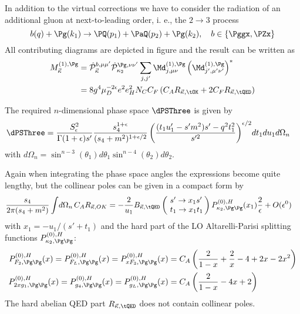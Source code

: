 \label{sec:NLO.g}
In addition to the virtual corrections we have to consider the radiation of an additional gluon at next-to-leading order, i. e., the $2\to 3$ process
\begin{equation}
b(q) + \Pg(k_1) \rightarrow \PQ(p_1)+\PaQ(p_2) + \Pg(k_2),\quad b\in\{\Pggx,\PZx\}
\end{equation}
All contributing diagrams are depicted in figure  and the result can be written as
\begin{align}
M_{\vec \kappa}^{(1),\Pg} &= \hat {\mathcal P}_{\vec \kappa}^{b,\mu\mu'}\hat {\mathcal P}_{\kappa_2}^{\Pg,\nu\nu'}\sum_{j,j'}\Md^{(1),\Pg}_{j,\mu\nu}\left(\Md^{(1),\Pg}_{j',\mu'\nu'}\right)^*\\
 &= 8g^4\mu_D^{-2\epsilon}e^2e_H^2 N_C C_F\left( C_A R_{\vec \kappa,\tOK} + 2C_F R_{\vec \kappa,\tQED}\right)
\end{align}

The required $n$-dimensional phase space $\dPSThree$ is given by
\begin{align}
\dPSThree &= \frac{S_\epsilon^2}{\Gamma(1+\epsilon)s'} \frac{s_4^{1+\epsilon}}{(s_4+m^2)^{1+\epsilon/2}}\left(\frac{(t_1u_1'-s'm^2)s' - q^2t_1^2}{s'^2}\right)^{\epsilon/2}\! dt_1 du_1 d\Omega_n
\end{align}
with $d\Omega_n = \sin^{n-3}(\theta_1)d\theta_1\sin^{n-4}(\theta_2)d\theta_2$.

Again when integrating the phase space angles the expressions become quite lengthy, but the collinear poles can be given in a compact form by
\begin{align}
\frac{s_4}{2\pi(s_4+m^2)}\int\!d\Omega_n \,C_A R_{\vec \kappa,OK} &=-\frac 2 {u_1}B_{\vec \kappa,\tQED}\left(\!\begin{array}{l}s'\rightarrow x_1s'\\t_1\rightarrow x_1 t_1\end{array}\!\!\right) P^{(0),H}_{\kappa_2,\Pg\Pg}(x_1)\frac 2 \epsilon + O(\epsilon^0) \label{eq:ROKPoles}
\end{align}
with $x_1 = -u_1/(s'+t_1)$ and the hard part of the LO Altarelli-Parisi splitting functions $P^{(0),H}_{\kappa_2,\Pg\Pg}$\cite{Altarelli:1977zs,Vogelsang:1995vh}:
\begin{align}
P^{(0),H}_{F_2,\Pg\Pg}(x) = P^{(0),H}_{F_L,\Pg\Pg}(x) = P^{(0),H}_{xF_3,\Pg\Pg}(x) &= C_A\left(\frac 2 {1-x} + \frac 2 x - 4 + 2x - 2x^2\right) \label{eq:PFggH}\\
P^{(0),H}_{2xg_1,\Pg\Pg}(x) = P^{(0),H}_{g_4,\Pg\Pg}(x) = P^{(0),H}_{g_L,\Pg\Pg}(x) &= C_A\left(\frac 2 {1-x} - 4x + 2\right) \label{eq:PgggH}
\end{align}
The hard abelian QED part $R_{\vec \kappa,\tQED}$ does not contain collinear poles.

